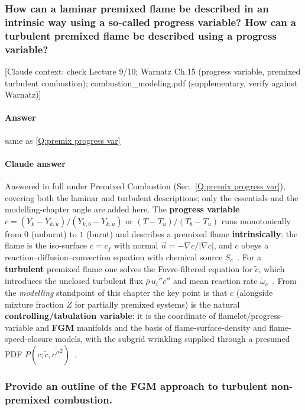 \subsubsection{How can a laminar premixed flame be described in an intrinsic way using a so-called progress variable? How can a turbulent premixed flame be described using a progress variable?}

{\color{gray}\footnotesize [Claude context: check Lecture 9/10; Warnatz Ch.15 (progress variable, premixed turbulent combustion); combustion\_modeling.pdf (supplementary, verify against Warnatz)]}

\paragraph{Answer} same as \ref{Q:premix progress var}

{\color{istblue}
\paragraph{Claude answer}
Answered in full under Premixed Combustion (Sec.~\ref{Q:premix progress var}), covering both the laminar and turbulent descriptions; only the essentials and the modelling-chapter angle are added here. The \textbf{progress variable} $c=(Y_k-Y_{k,u})/(Y_{k,b}-Y_{k,u})$ or $(T-T_u)/(T_b-T_u)$ runs monotonically from $0$ (unburnt) to $1$ (burnt) and describes a premixed flame \textbf{intrinsically}: the flame is the iso-surface $c=c_f$ with normal $\vec n=-\nabla c/|\nabla c|$, and $c$ obeys a reaction--diffusion--convection equation with chemical source $S_c$~\cite{lecture9,warnatz2006combustion}. For a \textbf{turbulent} premixed flame one solves the Favre-filtered equation for $\tilde c$, which introduces the unclosed turbulent flux $\overline{\rho}\,\widetilde{u_i''c''}$ and mean reaction rate $\overline{\dot\omega}_c$~\cite{lecture10,veynante2002turbulent}. From the \emph{modelling} standpoint of this chapter the key point is that $c$ (alongside mixture fraction $Z$ for partially premixed systems) is the natural \textbf{controlling/tabulation variable}: it is the coordinate of flamelet/progress-variable and \textbf{FGM} manifolds and the basis of flame-surface-density and flame-speed-closure models, with the subgrid wrinkling supplied through a presumed PDF $P(c;\tilde c,\widetilde{c''^2})$~\cite{lecture10,vanoijen2000fgm,peters2000turbulent}.
}






\subsubsection{Provide an outline of the FGM approach to turbulent non-premixed combustion.}

